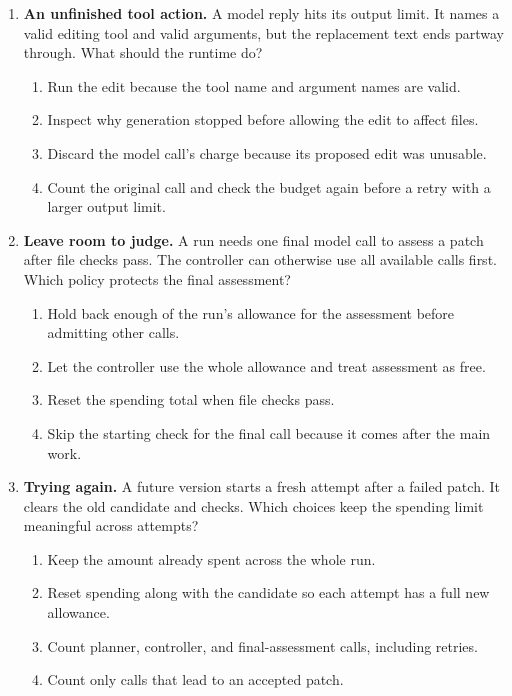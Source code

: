 \begin{enumerate}[start=51,itemsep=0.7\baselineskip]
\item\label{exercise:57} \begin{minipage}[t]{\linewidth}
\textbf{An unfinished tool action.} A model reply hits its output limit. It names a valid editing tool and valid arguments, but the replacement text ends partway through. What should the runtime do?
\begin{enumerate}[label=\textnormal{(\Alph*)},leftmargin=*,itemsep=0pt]
\item Run the edit because the tool name and argument names are valid.
\item Inspect why generation stopped before allowing the edit to affect files.
\item Discard the model call's charge because its proposed edit was unusable.
\item Count the original call and check the budget again before a retry with a larger output limit.
\end{enumerate}
\end{minipage}

\item\label{exercise:58} \begin{minipage}[t]{\linewidth}
\textbf{Leave room to judge.} A run needs one final model call to assess a patch after file checks pass. The controller can otherwise use all available calls first. Which policy protects the final assessment?
\begin{enumerate}[label=\textnormal{(\Alph*)},leftmargin=*,itemsep=0pt]
\item Hold back enough of the run's allowance for the assessment before admitting other calls.
\item Let the controller use the whole allowance and treat assessment as free.
\item Reset the spending total when file checks pass.
\item Skip the starting check for the final call because it comes after the main work.
\end{enumerate}
\end{minipage}

\item\label{exercise:59} \begin{minipage}[t]{\linewidth}
\textbf{Trying again.} A future version starts a fresh attempt after a failed patch. It clears the old candidate and checks. Which choices keep the spending limit meaningful across attempts?
\begin{enumerate}[label=\textnormal{(\Alph*)},leftmargin=*,itemsep=0pt]
\item Keep the amount already spent across the whole run.
\item Reset spending along with the candidate so each attempt has a full new allowance.
\item Count planner, controller, and final-assessment calls, including retries.
\item Count only calls that lead to an accepted patch.
\end{enumerate}
\end{minipage}


\end{enumerate}
